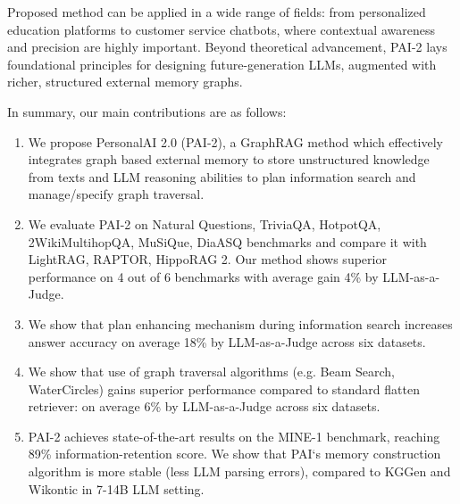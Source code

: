 Proposed method can be applied in a wide range of fields: from personalized education platforms to customer service chatbots, where contextual awareness and precision are highly important. Beyond theoretical advancement, PAI-2 lays foundational principles for designing future-generation LLMs, augmented with richer, structured external memory graphs.

In summary, our main contributions are as follows:
\begin{enumerate}
    \item We propose PersonalAI 2.0 (PAI-2), a GraphRAG method which effectively integrates graph based external memory to store unstructured knowledge from texts and LLM reasoning abilities to plan information search and manage/specify graph traversal.
    \item We evaluate PAI-2 on Natural Questions, TriviaQA, HotpotQA, 2WikiMultihopQA, MuSiQue, DiaASQ benchmarks and compare it with LightRAG, RAPTOR, HippoRAG 2. Our method shows superior performance on 4 out of 6 benchmarks with average gain 4\% by LLM-as-a-Judge. 
    \item We show that plan enhancing mechanism during information search increases answer accuracy on average 18\% by LLM-as-a-Judge across six datasets.
    \item We show that use of graph traversal algorithms (e.g. Beam Search, WaterCircles) gains superior performance compared to standard flatten retriever: on average 6\% by LLM-as-a-Judge across six datasets.
    \item PAI-2 achieves state-of-the-art results on the MINE-1 benchmark, reaching 89\% information-retention score. We show that PAI`s memory construction algorithm is more stable (less LLM parsing errors), compared to KGGen and Wikontic in 7-14B LLM setting. 
\end{enumerate}
